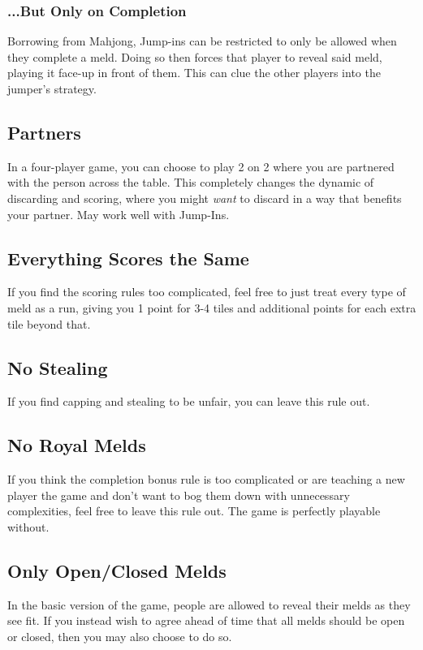 \subsubsection{...But Only on Completion}\label{sec:jump-in}
Borrowing from Mahjong, Jump-ins can be restricted to only be allowed when they complete a meld. 
Doing so then forces that player to reveal said meld, playing it face-up in front of them. This can clue the other players into the jumper's strategy.

\subsection{Partners}
In a four-player game, you can choose to play 2 on 2 where you are partnered with the person across the table.
This completely changes the dynamic of discarding and scoring, where you might \textit{want} to discard in a way that benefits your partner. May work well with Jump-Ins.

\subsection{Everything Scores the Same}
If you find the scoring rules too complicated, feel free to just treat every type of meld as a run, giving you 1 point for 3-4 tiles and additional points for each extra tile beyond that.

\subsection{No Stealing}
If you find capping and stealing to be unfair, you can leave this rule out.

\subsection{No Royal Melds}
If you think the completion bonus rule is too complicated or are teaching a new player the game and don't want to bog them down with unnecessary complexities, feel free to leave this rule out.
The game is perfectly playable without.

\subsection{Only Open/Closed Melds}
In the basic version of the game, people are allowed to reveal their melds as they see fit.
If you instead wish to agree ahead of time that all melds should be open or closed, then you may also choose to do so.

